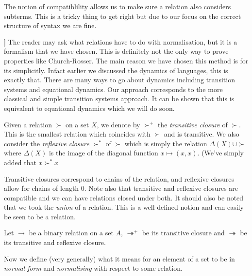 \begin{remark}
    The notion of compatiblility allows us to make sure a relation also considers subterms. This is a tricky thing to get right but due to our focus on the correct structure of syntax we are fine.
\end{remark}

\begin{remark}
[[CLEAN THIS UP]]
    The reader may ask what relations have to do with normalisation, but it is a formalism that we have chosen. This is definitely not the only way to prove properties like Church-Rosser. The main reason we have chosen this method is for its simplicitly. Infact earlier we discussed the dynamics of languages, this is exactly that. There are many ways to go about dynamics including transition systems and equational dynamics. Our approach corresponds to the more classical and simple transition systems approach. It can be shown that this is equivalent to equational dynamics which we will do soon.
\end{remark}

\begin{defin}
    Given a relation $\succ$ on a set $X$, we denote by $\succ^+$ the \emph{transitive closure} of $\succ$. This is the smallest relation which coincides with $\succ$ and is transitive. We also consider the \emph{reflexive closure} $\succ^*$ of $\succ$ which is simply the relation $\Delta(X)\cup \succ $ where $\Delta(X)$ is the image of the diagonal function $x \mapsto (x,x)$. (We've simply added that $x \succ^* x$
\end{defin}

\begin{remark}
    Transitive closures correspond to chains of the relation, and reflexive closures allow for chains of length $0$. Note also that transitive and reflexive closures are compatible and we can have relations closed under both. It should also be noted that we took the \emph{union} of a relation. This is a well-defined notion and can easily be seen to be a relation.
\end{remark}

Let $\to$ be a binary relation on a set $A$, $\twoheadrightarrow^+$ be its transitive closure and $\twoheadrightarrow$ be its transitive and reflexive closure.

Now we define (very generally) what it means for an element of a set to be in \emph{normal form} and \emph{normalising} with respect to some relation.

